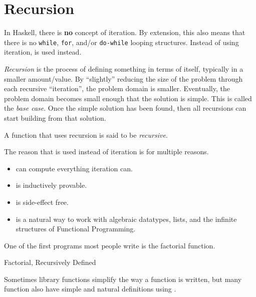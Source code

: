 \section{Recursion}\label{sec:Recursion}
In Haskell, there is \textbf{no} concept of iteration.
By extension, this also means that there is no \texttt{while}, \texttt{for}, and/or \texttt{do-while} looping structures.
Instead of using iteration,  is used instead.

\begin{definition}[Recursion]\label{def:Recursion}
  \emph{Recursion} is the process of defining something in terms of itself, typically in a smaller amount/value.
  By ``slightly'' reducing the size of the problem through each recursive ``iteration'', the problem domain is smaller.
  Eventually, the problem domain becomes small enough that the solution is simple.
  This is called the \emph{base case}.
  Once the simple solution has been found, then all recursions can start building from that solution.

  \begin{remark}[Recursive]\label{rmk:Recursive}
    A function that uses recursion is said to be \emph{recursive}.
  \end{remark}
\end{definition}

The reason that  is used instead of iteration is for multiple reasons.
\begin{itemize}[noitemsep]
\item {} can compute everything iteration can.
\item {} is inductively provable.
\item {} is side-effect free.
\item {} is a natural way to work with algebraic datatypes, lists, and the infinite structures of Functional Programming.
\end{itemize}

One of the first  programs most people write is the factorial function.
\begin{listing}[h!tbp]
\caption{Factorial, Recursively Defined}
\label{lst:Recursive_Factorial}
\end{listing}

Sometimes library functions simplify the way a function is written, but many function also have simple and natural definitions using .







